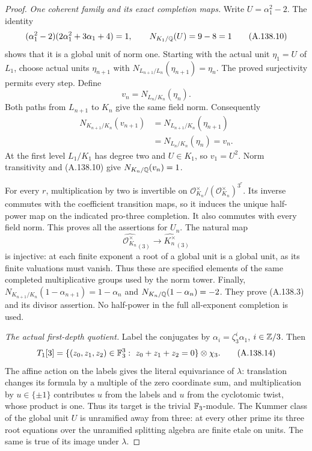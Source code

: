 \begin{proof}
\emph{One coherent family and its exact completion maps.}
Write \(U=\alpha_1^2-2\).
The identity
\[
 (\alpha_1^2-2)(2\alpha_1^2+3\alpha_1+4)=1,
                  \qquad N_{K_1/\mathbb Q}(U)=9-8=1
\tag{A.138.10}
\]
shows that it is a global unit of norm one.
Starting with the actual unit \(\eta_1=U\)
of \(L_1\), choose actual units
\(\eta_{n+1}\) with
\(N_{L_{n+1}/L_n}(\eta_{n+1})=\eta_n\).
The proved surjectivity permits every step.
Define
\[
                  v_n=N_{L_n/K_n}(\eta_n).
\tag{A.138.11}
\]
Both paths from \(L_{n+1}\) to \(K_n\)
give the same field norm.
Consequently
\[
 \begin{aligned}
 N_{K_{n+1}/K_n}(v_{n+1})
 &=N_{L_{n+1}/K_n}(\eta_{n+1})\\
 &=N_{L_n/K_n}(\eta_n)=v_n .
 \end{aligned}
\tag{A.138.12}
\]
At the first level \(L_1/K_1\) has degree two
and \(U\in K_1\), so \(v_1=U^2\).
Norm transitivity and (A.138.10) give
\(N_{K_n/\mathbb Q}(v_n)=1\).

For every \(r\), multiplication by two is
invertible on
\(\mathcal O_{K_n}^\times/
(\mathcal O_{K_n}^\times)^{3^r}\).
Its inverse commutes with the coefficient
transition maps, so it induces the unique
half-power map on the indicated pro-three
completion.
It also commutes with every field norm.
This proves all the assertions for \(U_n\).
The natural map
\[
 \widehat{\mathcal O_{K_n}^\times}_{(3)}
               \longrightarrow\widehat{K_n^\times}_{(3)}
\tag{A.138.13}
\]
is injective: at each finite exponent a root
of a global unit is a global unit, as its
finite valuations must vanish.
Thus these are specified elements of the
same completed multiplicative groups used
by the norm tower.
Finally,
\(N_{K_{n+1}/K_n}(1-\alpha_{n+1})=1-\alpha_n\)
and \(N_{K_n/\mathbb Q}(1-\alpha_n)=-2\).
They prove (A.138.3) and its divisor assertion.
No half-power in the full all-exponent
completion is used.

\emph{The actual first-depth quotient.}
Label the conjugates by
\(\alpha_i=\zeta_3^i\alpha_1\), \(i\in\mathbb Z/3\).
Then
\[
 T_1[3]=
 \{(z_0,z_1,z_2)\in\mathbb F_3^3:\ z_0+z_1+z_2=0\}
                  \otimes\chi_3 .
\tag{A.138.14}
\]
The affine action on the labels gives the
literal equivariance of \(\lambda\):
translation changes its formula by a multiple
of the zero coordinate sum, and multiplication
by \(u\in\{\pm1\}\) contributes \(u\) from
the labels and \(u\) from the cyclotomic
twist, whose product is one.
Thus its target is the trivial \(\mathbb F_3\)-module.
The Kummer class of the global unit \(U\)
is unramified away from three: at every
other prime its three root equations over
the unramified splitting algebra are finite
etale on units.
The same is true of its image under
\(\lambda\).


\end{proof}
